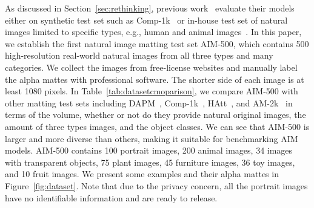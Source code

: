 \documentclass{article}
\begin{document}
As discussed in Section~\ref{sec:rethinking}, previous work~\cite{zhang2019late,Qiao_2020_CVPR} evaluate their models either on synthetic test set such as Comp-1k~\cite{xu2017deep} or in-house test set of natural images limited to specific types, e.g., human and animal images~\cite{gfm,chen2018semantic}. In this paper, we establish the first natural image matting test set AIM-500, which contains 500 high-resolution real-world natural images from all three types and many categories. We collect the images from free-license websites and manually label the alpha mattes with professional software. The shorter side of each image is at least 1080 pixels. In Table~\ref{tab:datasetcmoparison}, we compare AIM-500 with other matting test sets including DAPM~\cite{shen2016deep}, Comp-1k~\cite{xu2017deep}, HAtt~\cite{Qiao_2020_CVPR}, and AM-2k~\cite{gfm} in terms of the volume, whether or not do they provide natural original images, the amount of three types images, and the object classes. We can see that AIM-500 is larger and more diverse than others, making it suitable for benchmarking AIM models. AIM-500 contains 100 portrait images, 200 animal images, 34 images with transparent objects, 75 plant images, 45 furniture images, 36 toy images, and 10 fruit images. We present some examples and their alpha mattes in Figure~\ref{fig:dataset}. Note that due to the privacy concern, all the portrait images have no identifiable information and are ready to release.
\end{document}
